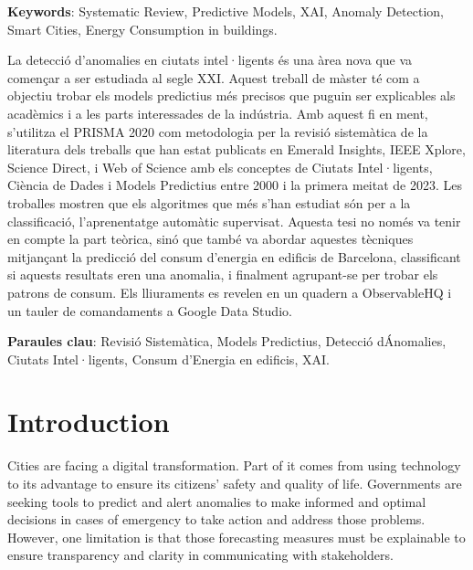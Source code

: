 \documentclass[a4paper,12pt,twoside]{ThesisStyle}
\begin{document}
\vspace{5mm} 
\textbf{Keywords}: Systematic Review, Predictive Models, XAI, Anomaly Detection, Smart Cities, Energy Consumption in buildings.

\vspace{10mm} 

La detecció d'anomalies en ciutats intel·ligents és una àrea nova que va començar a ser estudiada al segle XXI. Aquest treball de màster té com a objectiu trobar els models predictius més precisos que puguin ser explicables als acadèmics i a les parts interessades de la indústria. Amb aquest fi en ment, s'utilitza el PRISMA 2020 com metodologia per la revisió sistemàtica de la literatura dels treballs que han estat publicats en Emerald Insights, IEEE Xplore, Science Direct, i Web of Science amb els conceptes de Ciutats Intel·ligents, Ciència de Dades i Models Predictius entre 2000 i la primera meitat de 2023. Les troballes mostren que els algoritmes que més s'han estudiat són per a la classificació, l'aprenentatge automàtic supervisat. Aquesta tesi no només va tenir en compte la part teòrica, sinó que també va abordar aquestes tècniques mitjançant la predicció del consum d'energia en edificis de Barcelona, classificant si aquests resultats eren una anomalia, i finalment agrupant-se per trobar els patrons de consum. Els lliuraments es revelen en un quadern a ObservableHQ i un tauler de comandaments a Google Data Studio.

\vspace{5mm} 
\textbf{Paraules clau}: Revisió Sistemàtica, Models Predictius, Detecció d\'Anomalies, Ciutats Intel·ligents, Consum d'Energia en edificis, XAI.

\tableofcontents

\mainmatter

\chapter{Introduction}
\label{cap:intro}

\vspace{5mm} 

Cities are facing a digital transformation. Part of it comes from using technology to its advantage to ensure its citizens' safety and quality of life. Governments are seeking tools to predict and alert anomalies to make informed and optimal decisions in cases of emergency to take action and address those problems. However, one limitation is that those forecasting measures must be explainable to ensure transparency and clarity in communicating with stakeholders.
\end{document}
